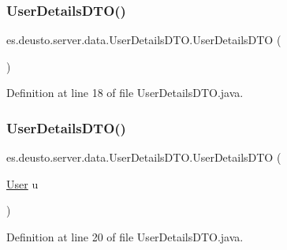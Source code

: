 \subsubsection{\texorpdfstring{UserDetailsDTO()}{UserDetailsDTO()}\hspace{0.1cm}{\footnotesize\ttfamily [1/2]}}
{\footnotesize\ttfamily es.\+deusto.\+server.\+data.\+User\+Details\+D\+T\+O.\+User\+Details\+D\+TO (\begin{DoxyParamCaption}{ }\end{DoxyParamCaption})}



Definition at line 18 of file User\+Details\+D\+T\+O.\+java.

\mbox{\label{classes_1_1deusto_1_1server_1_1data_1_1_user_details_d_t_o_aae05e33019f1da5126c95feda9f7d25a}} 
\subsubsection{\texorpdfstring{UserDetailsDTO()}{UserDetailsDTO()}\hspace{0.1cm}{\footnotesize\ttfamily [2/2]}}
{\footnotesize\ttfamily es.\+deusto.\+server.\+data.\+User\+Details\+D\+T\+O.\+User\+Details\+D\+TO (\begin{DoxyParamCaption}\item[{\mbox{\hyperlink{classes_1_1deusto_1_1server_1_1jdo_1_1_user}{User}}}]{u }\end{DoxyParamCaption})}



Definition at line 20 of file User\+Details\+D\+T\+O.\+java.

